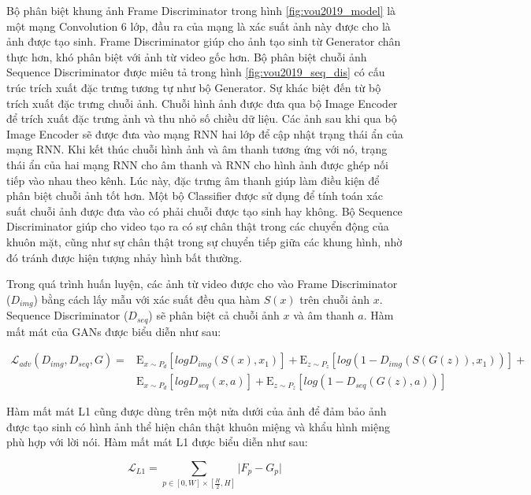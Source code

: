 Bộ phân biệt khung ảnh Frame Discriminator trong hình \ref{fig:vou2019_model} là một mạng Convolution 6 lớp, đầu ra của mạng là xác suất ảnh này được cho là ảnh được tạo sinh. Frame Discriminator giúp cho ảnh tạo sinh từ Generator chân thực hơn, khó phân biệt với ảnh từ video gốc hơn. Bộ phân biệt chuỗi ảnh Sequence Discriminator được miêu tả trong hình \ref{fig:vou2019_seq_dis} có cấu trúc trích xuất đặc trưng tương tự như bộ Generator. Sự khác biệt đến từ bộ trích xuất đặc trưng chuỗi ảnh. Chuỗi hình ảnh được đưa qua bộ Image Encoder để trích xuất đặc trưng ảnh và thu nhỏ số chiều dữ liệu. Các ảnh sau khi qua bộ Image Encoder sẽ được đưa vào mạng RNN hai lớp để cập nhật trạng thái ẩn của mạng RNN. Khi kết thúc chuỗi hình ảnh và âm thanh tương ứng với nó, trạng thái ẩn của hai mạng RNN cho âm thanh và RNN cho hình ảnh được ghép nối tiếp vào nhau theo kênh. Lúc này, đặc trưng âm thanh giúp làm điều kiện để phân biệt chuỗi ảnh tốt hơn. Một bộ Classifier được sử dụng để tính toán xác suất chuỗi ảnh được đưa vào có phải chuỗi được tạo sinh hay không. Bộ Sequence Discriminator giúp cho video tạo ra có sự chân thật trong các chuyển động của khuôn mặt, cũng như sự chân thật trong sự chuyển tiếp giữa các khung hình, nhờ đó tránh được hiện tượng nhảy hình bất thường.

Trong quá trình huấn luyện, các ảnh từ video được cho vào Frame Discriminator ($D_{img}$) bằng cách lấy mẫu với xác suất đều qua hàm $S(x)$ trên chuỗi ảnh $x$. Sequence Discriminator ($D_{seq}$) sẽ phân biệt cả chuỗi ảnh $x$ và âm thanh $a$. Hàm mất mát của GANs được biểu diễn như sau:

\begin{equation}
    \begin{split}
    \mathcal{L}_{adv}(D_{img},D_{seq},G) = &\mathrm{E}_{x\sim P_d}[logD_{img}(S(x),x_1)] + \mathrm{E}_{z\sim P_z}[log(1 - D_{img}(S(G(z)), x_1))] + \\
    &\mathrm{E}_{x\sim P_d}[logD_{seq}(x,a)] + \mathrm{E}_{z\sim P_z}[log(1 - D_{seq}(G(z), a))]
    \end{split}
    \label{eqn:vou2019_adv_loss}
\end{equation}

Hàm mất mát L1 cũng được dùng trên một nửa dưới của ảnh để đảm bảo ảnh được tạo sinh có hình ảnh thể hiện chân thật khuôn miệng và khẩu hình miệng phù hợp với lời nói. Hàm mất mát L1 được biểu diễn như sau:

\begin{equation}
    \mathcal{L}_{L1} = \sum_{p\in[0,W]\times[\frac{H}{2},H]}\vert F_p - G_p \vert
    \label{eqn:vou2019_l1_loss}
\end{equation}

